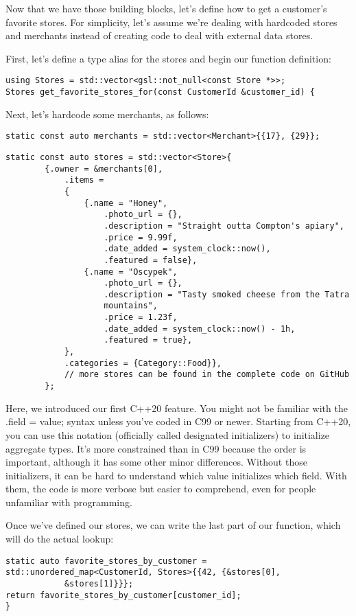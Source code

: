 Now that we have those building blocks, let's define how to get a customer's favorite stores. For simplicity, let's assume we're dealing with hardcoded stores and merchants instead of creating code to deal with external data stores.

First, let's define a type alias for the stores and begin our function definition:

\begin{lstlisting}[style=styleCXX]
using Stores = std::vector<gsl::not_null<const Store *>>;
Stores get_favorite_stores_for(const CustomerId &customer_id) {
\end{lstlisting}

Next, let's hardcode some merchants, as follows:

\begin{lstlisting}[style=styleCXX]
	static const auto merchants = std::vector<Merchant>{{17}, {29}};
\end{lstlisting}


\begin{lstlisting}[style=styleCXX]
	static const auto stores = std::vector<Store>{
		{.owner = &merchants[0],
			.items =
			{
				{.name = "Honey",
					.photo_url = {},
					.description = "Straight outta Compton's apiary",
					.price = 9.99f,
					.date_added = system_clock::now(),
					.featured = false},
				{.name = "Oscypek",
					.photo_url = {},
					.description = "Tasty smoked cheese from the Tatra
					mountains",
					.price = 1.23f,
					.date_added = system_clock::now() - 1h,
					.featured = true},
			},
			.categories = {Category::Food}},
			// more stores can be found in the complete code on GitHub
		};
\end{lstlisting}

Here, we introduced our first C++20 feature. You might not be familiar with the .field = value; syntax unless you've coded in C99 or newer. Starting from C++20, you can use this notation (officially called designated initializers) to initialize aggregate types. It's more constrained than in C99 because the order is important, although it has some other minor differences. Without those initializers, it can be hard to understand which value initializes which field. With them, the code is more verbose but easier to comprehend, even for people unfamiliar with programming.

Once we've defined our stores, we can write the last part of our function, which will do the actual lookup:

\begin{lstlisting}[style=styleCXX]
static auto favorite_stores_by_customer =
std::unordered_map<CustomerId, Stores>{{42, {&stores[0],
			&stores[1]}}};
return favorite_stores_by_customer[customer_id];
}
\end{lstlisting}

